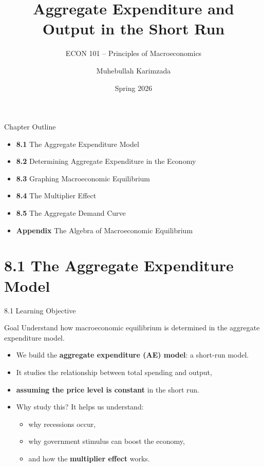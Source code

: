 \documentclass[aspectratio=169]{beamer}
\title{\textbf{Aggregate Expenditure and Output in the Short Run}}
\subtitle{{\large ECON 101 -- Principles of Macroeconomics}}
\author{Muhebullah Karimzada}
\date{Spring 2026}
\begin{document}

\begin{frame}[plain]
  \titlepage
\end{frame}

\begin{frame}{Chapter Outline}
\transfade
\begin{itemize}[<+->]
  \item \textbf{8.1} The Aggregate Expenditure Model
  \item \textbf{8.2} Determining Aggregate Expenditure in the Economy
  \item \textbf{8.3} Graphing Macroeconomic Equilibrium
  \item \textbf{8.4} The Multiplier Effect
  \item \textbf{8.5} The Aggregate Demand Curve
  \item \textbf{Appendix} The Algebra of Macroeconomic Equilibrium
\end{itemize}
\end{frame}

\section{8.1 The Aggregate Expenditure Model}

\begin{frame}{8.1 Learning Objective}
\transfade
\begin{block}{Goal}
Understand how macroeconomic equilibrium is determined in the aggregate expenditure model.
\end{block}
\begin{itemize}[<+->]
  \item We build the \textbf{aggregate expenditure (AE) model}: a short-run model.
  \item It studies the relationship between total spending and output,
  \item \textbf{assuming the price level is constant} in the short run.
  \item Why study this? It helps us understand:
  \begin{itemize}[<+->]
    \item why recessions occur,
    \item why government stimulus can boost the economy,
    \item and how the \textbf{multiplier effect} works.
  \end{itemize}
\end{itemize}
\end{frame}
\end{document}
